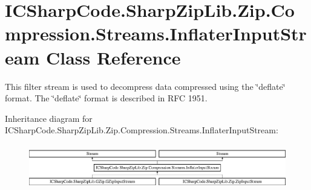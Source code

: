 \hypertarget{class_i_c_sharp_code_1_1_sharp_zip_lib_1_1_zip_1_1_compression_1_1_streams_1_1_inflater_input_stream}{}\section{I\+C\+Sharp\+Code.\+Sharp\+Zip\+Lib.\+Zip.\+Compression.\+Streams.\+Inflater\+Input\+Stream Class Reference}
\label{class_i_c_sharp_code_1_1_sharp_zip_lib_1_1_zip_1_1_compression_1_1_streams_1_1_inflater_input_stream}


This filter stream is used to decompress data compressed using the \char`\"{}deflate\char`\"{} format. The \char`\"{}deflate\char`\"{} format is described in R\+FC 1951.  


Inheritance diagram for I\+C\+Sharp\+Code.\+Sharp\+Zip\+Lib.\+Zip.\+Compression.\+Streams.\+Inflater\+Input\+Stream\+:\begin{figure}[H]
\begin{center}
\leavevmode
\includegraphics[height=1.962617cm]{class_i_c_sharp_code_1_1_sharp_zip_lib_1_1_zip_1_1_compression_1_1_streams_1_1_inflater_input_stream}
\end{center}
\end{figure}

